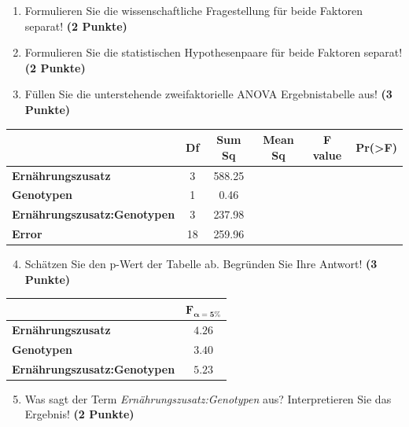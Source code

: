 \documentclass[a4paper, 9pt]{scrartcl}\usepackage[]{graphicx}\usepackage[]{xcolor}
\begin{document}
\begin{enumerate}
  \item Formulieren Sie die wissenschaftliche Fragestellung für beide Faktoren separat! \textbf{(2 Punkte)}
  \item Formulieren Sie die statistischen Hypothesenpaare für beide Faktoren separat! \textbf{(2 Punkte)}
\item Füllen Sie die unterstehende zweifaktorielle ANOVA Ergebnistabelle aus! \textbf{(3 Punkte)}
\end{enumerate}

\vspace{1Ex}

\begin{center}
  \Large
  \begin{tabular}{lccccc}
  \toprule
     & \textbf{Df} & \textbf{Sum Sq} & \textbf{Mean Sq} & \textbf{F value} & \textbf{Pr(>F)} \strut\\
    \midrule
   \textbf{Ernährungszusatz}  & 3 & 588.25 &  &  &  \strut\\
    \textbf{Genotypen}  & 1 & 0.46 &  &  &  \strut\\
    \textbf{Ernährungszusatz:Genotypen}  & 3 & 237.98 &  &  &  \strut\\
   \textbf{Error}  & 18 & 259.96 &  &  &  \strut\\
\bottomrule
  \end{tabular}
\end{center}

\vspace{1Ex}

\begin{enumerate}
  \setcounter{enumi}{3}
\item Schätzen Sie den p-Wert der Tabelle ab. Begründen Sie Ihre Antwort! \textbf{(3 Punkte)}
\end{enumerate}
  
\begin{center}
    \Large
\begin{tabular}{lc}
  \toprule
     & $\boldsymbol{F_{\alpha = 5\%}}$ \\
\midrule
  \textbf{Ernährungszusatz} & $4.26$ \\
  \textbf{Genotypen} & $3.40$ \\
  \textbf{Ernährungszusatz:Genotypen} & $5.23$ \\
  \bottomrule
  \end{tabular}
\end{center}

\begin{enumerate}
  \setcounter{enumi}{4}
\item Was sagt der Term \textit{Ernährungszusatz:Genotypen} aus? Interpretieren Sie das Ergebnis! \textbf{(2 Punkte)}
\end{enumerate}
 
\end{document}
